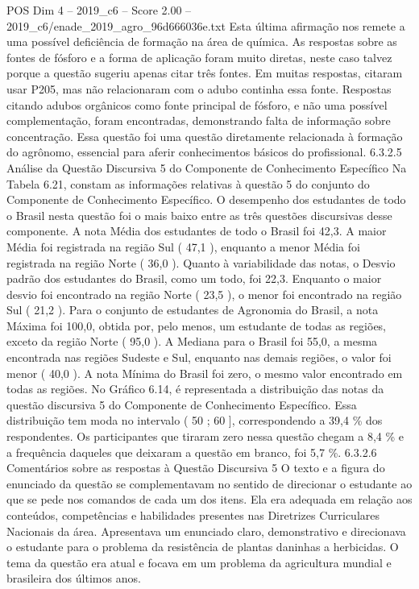\begin{textsample}{POS Dim 4 – 2019\_c6 – Score 2.00 – 2019\_c6/enade\_2019\_agro\_96d666036e.txt}
Esta última afirmação nos remete a uma possível deficiência de formação na área de química.
As respostas sobre as fontes de fósforo e a forma de aplicação foram muito diretas, neste caso talvez porque a questão sugeriu apenas citar três fontes.
Em muitas respostas, citaram usar P205, mas não relacionaram com o adubo continha essa fonte.
Respostas citando adubos orgânicos como fonte principal de fósforo, e não uma possível complementação, foram encontradas, demonstrando falta de informação sobre concentração.
Essa questão foi uma questão diretamente relacionada à formação do agrônomo, essencial para aferir conhecimentos básicos do profissional. 6.3.2.5 Análise da Questão Discursiva 5 do Componente de Conhecimento Específico Na Tabela 6.21, constam as informações relativas à questão 5 do conjunto do Componente de Conhecimento Específico.
O desempenho dos estudantes de todo o Brasil nesta questão foi o mais baixo entre as três questões discursivas desse componente.
A nota Média dos estudantes de todo o Brasil foi 42,3.
A maior Média foi registrada na região Sul ( 47,1 ), enquanto a menor Média foi registrada na região Norte ( 36,0 ).
Quanto à variabilidade das notas, o Desvio padrão dos estudantes do Brasil, como um todo, foi 22,3.
Enquanto o maior desvio foi encontrado na região Norte ( 23,5 ), o menor foi encontrado na região Sul ( 21,2 ).
Para o conjunto de estudantes de Agronomia do Brasil, a nota Máxima foi 100,0, obtida por, pelo menos, um estudante de todas as regiões, exceto da região Norte ( 95,0 ).
A Mediana para o Brasil foi 55,0, a mesma encontrada nas regiões Sudeste e Sul, enquanto nas demais regiões, o valor foi menor ( 40,0 ).
A nota Mínima do Brasil foi zero, o mesmo valor encontrado em todas as regiões.
No Gráfico 6.14, é representada a distribuição das notas da questão discursiva 5 do Componente de Conhecimento Específico.
Essa distribuição tem moda no intervalo ( 50 ; 60 ], correspondendo a 39,4 \% dos respondentes.
Os participantes que tiraram zero nessa questão chegam a 8,4 \% e a frequência daqueles que deixaram a questão em branco, foi 5,7 \%. 6.3.2.6 Comentários sobre as respostas à Questão Discursiva 5 O texto e a figura do enunciado da questão se complementavam no sentido de direcionar o estudante ao que se pede nos comandos de cada um dos itens.
Ela era adequada em relação aos conteúdos, competências e habilidades presentes nas Diretrizes Curriculares Nacionais da área.
Apresentava um enunciado claro, demonstrativo e direcionava o estudante para o problema da resistência de plantas daninhas a herbicidas.
O tema da questão era atual e focava em um problema da agricultura mundial e brasileira dos últimos anos.

\end{textsample}
